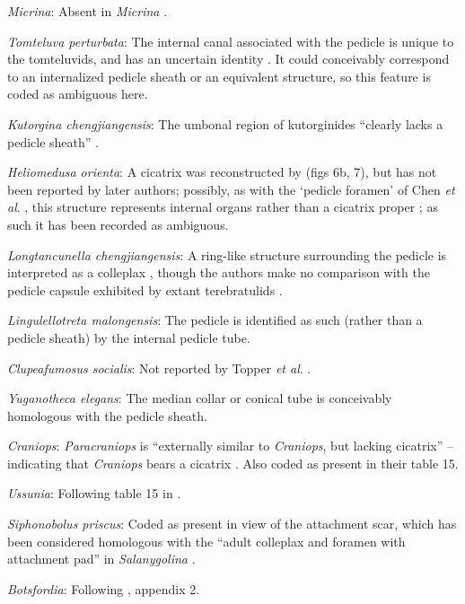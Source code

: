 \documentclass[]{book}
\theoremstyle{definition}
\theoremstyle{definition}
\theoremstyle{definition}
\theoremstyle{remark}
\begin{document}
\emph{Micrina}: Absent in \emph{Micrina} \citep{Holmer2011Firstrecord}.

\emph{Tomteluva perturbata}: The internal canal associated with the
pedicle is unique to the tomteluvids, and has an uncertain identity
\citep{Streng2016Anew}. It could conceivably correspond to an
internalized pedicle sheath or an equivalent structure, so this feature
is coded as ambiguous here.

\emph{Kutorgina chengjiangensis}: The umbonal region of kutorginides
``clearly lacks a pedicle sheath'' \citep{Holmer2018Theattachment}.

\emph{Heliomedusa orienta}: A cicatrix was reconstructed by
\citet{Jin1992Revisionof} (figs 6b, 7), but has not been reported by
later authors; possibly, as with the `pedicle foramen' of Chen \emph{et
al}. \citeyearpar{Chen2007Reinterpretationof}, this structure represents
internal organs rather than a cicatrix proper
\citep{Zhang2009Architectureand}; as such it has been recorded as
ambiguous.

\emph{Longtancunella chengjiangensis}: A ring-like structure surrounding
the pedicle is interpreted as a colleplax
\citep{Zhang2011Theexceptionally}, though the authors make no comparison
with the pedicle capsule exhibited by extant terebratulids
\citep[see][]{Holmer2018Evolutionarysignificance}.

\emph{Lingulellotreta malongensis}: The pedicle is identified as such
(rather than a pedicle sheath) by the internal pedicle tube.

\emph{Clupeafumosus socialis}: Not reported by Topper \emph{et al}.
\citeyearpar{Topper2013Reappraisalof}.

\emph{Yuganotheca elegans}: The median collar or conical tube is
conceivably homologous with the pedicle sheath.

\emph{Craniops}: \emph{Paracraniops} is ``externally similar to
\emph{Craniops}, but lacking cicatrix'' -- indicating that
\emph{Craniops} bears a cicatrix
\citep{Williams2000BrachiopodaLinguliformea}. Also coded as present in
their table 15.

\emph{Ussunia}: Following table 15 in
\citet{Williams2000BrachiopodaLinguliformea}.

\emph{Siphonobolus priscus}: Coded as present in view of the attachment
scar, which has been considered homologous with the ``adult colleplax
and foramen with attachment pad'' in \emph{Salanygolina}
\citep{Popov2009Earlyontogeny}.

\emph{Botsfordia}: Following \citet{Williams1998Thediversity}, appendix
2.
\end{document}
